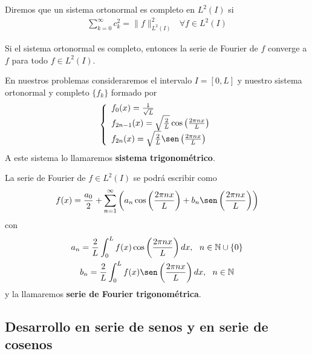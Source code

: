 \documentclass[12pt]{book}
\begin{document}
    \begin{definicion}
        Diremos que un sistema ortonormal es completo en $L^2(I)$ si 
        \begin{gather*}
            \sum_{k=0}^{\infty}c_k^2 = \| f \|^2_{L^2(I)}\ \ \ \forall f \in L^2(I)
        \end{gather*}
    \end{definicion}

    \begin{lema}
        Si el sistema ortonormal es completo, entonces la serie de Fourier de $f$ converge a $f$ para todo $f\in L^2(I)$.
    \end{lema}
    
    En nuestros problemas consideraremos el intervalo $I=[0,L]$ y nuestro sistema ortonormal y completo $\{f_k\}$ formado por 
    \begin{gather*}
        \left\{
        \begin{array}{l}
            f_0(x) = \frac{1}{\sqrt{L}}\\
            f_{2n-1}(x) = \sqrt{\frac{2}{L}} \cos \left(\frac{2\pi n x}{L}\right)\\
            f_{2n}(x) = \sqrt{\frac{2}{L}} \sen \left(\frac{2\pi n x}{L}\right)
        \end{array}
        \right.
    \end{gather*}
    A este sistema lo llamaremos \textbf{sistema trigonométrico}.

    La serie de Fourier de $f\in L^2(I)$ se podrá escribir como 
    \begin{gather*}
        f(x) = \frac{a_0}{2} + \sum_{n=1}^{\infty}\left( a_n \cos \left(\frac{2\pi n x}{L}\right) + b_n \sen \left(\frac{2\pi n x}{L}\right)  \right)
    \end{gather*}
    con 
    \begin{gather*}
        a_n = \frac{2}{L} \int_0^L f(x) \cos \left(\frac{2\pi n x}{L}\right) dx,\ \ n\in \bb{N}\cup \{0\}\\
        b_n = \frac{2}{L} \int_0^L f(x) \sen \left(\frac{2\pi n x}{L}\right) dx,\ \ n\in \bb{N}\\
    \end{gather*}
    y la llamaremos \textbf{serie de Fourier trigonométrica}.

    \subsection{Desarrollo en serie de senos y en serie de cosenos}
\end{document}
